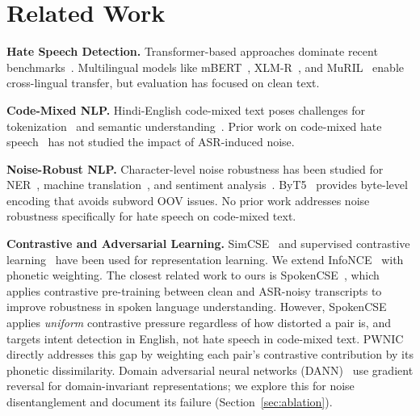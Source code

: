 \documentclass[conference]{IEEEtran}
\begin{document}
\section{Related Work}

\textbf{Hate Speech Detection.} Transformer-based approaches dominate recent benchmarks~\cite{mozafari2020bert, caselli2020hatebert}. Multilingual models like mBERT~\cite{devlin2019bert}, XLM-R~\cite{conneau2020xlmr}, and MuRIL~\cite{khanuja2021muril} enable cross-lingual transfer, but evaluation has focused on clean text.

\textbf{Code-Mixed NLP.} Hindi-English code-mixed text poses challenges for tokenization~\cite{pratapa2018language} and semantic understanding~\cite{khanuja2020gluecos}. Prior work on code-mixed hate speech~\cite{bohra2018dataset, mandl2021hasoc} has not studied the impact of ASR-induced noise.

\textbf{Noise-Robust NLP.} Character-level noise robustness has been studied for NER~\cite{piktus2019misspelling}, machine translation~\cite{belinkov2018synthetic}, and sentiment analysis~\cite{eger2019text}. ByT5~\cite{xue2022byt5} provides byte-level encoding that avoids subword OOV issues. No prior work addresses noise robustness specifically for hate speech on code-mixed text.

\textbf{Contrastive and Adversarial Learning.} SimCSE~\cite{gao2021simcse} and supervised contrastive learning~\cite{khosla2020supervised} have been used for representation learning. We extend InfoNCE~\cite{oord2018representation} with phonetic weighting. The closest related work to ours is SpokenCSE~\cite{chang2022spokencse}, which applies contrastive pre-training between clean and ASR-noisy transcripts to improve robustness in spoken language understanding. However, SpokenCSE applies \textit{uniform} contrastive pressure regardless of how distorted a pair is, and targets intent detection in English, not hate speech in code-mixed text. PWNIC directly addresses this gap by weighting each pair's contrastive contribution by its phonetic dissimilarity. Domain adversarial neural networks (DANN)~\cite{ganin2016domain} use gradient reversal for domain-invariant representations; we explore this for noise disentanglement and document its failure (Section~\ref{sec:ablation}).

\end{document}
